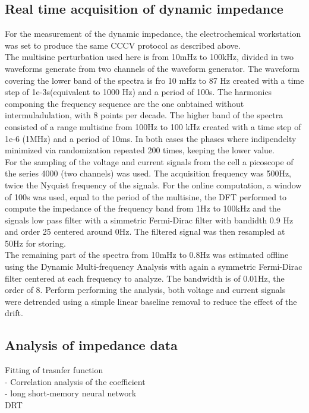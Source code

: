 \subsection{Real time acquisition of dynamic impedance}
For the measurement of the dynamic impedance, the electrochemical workstation was set to produce the same CCCV protocol as described above.\\
The multisine perturbation used here is from 10mHz to 100kHz, divided in two waveforms generate from two channels of the waveform generator. The waveform covering the lower band of the spectra is fro 10 mHz to 87 Hz created with a time step of  1e-3s(equivalent to 1000 Hz) and a period of 100s. The harmonics componing the frequency sequence are the one onbtained without intermuladulation, with 8 points per decade. The higher band of the spectra consisted of a range 
multisine from 100Hz to 100 kHz created with a time step of 1e-6 (1MHz) and a period of 10ms. In both cases the phases where indipendelty minimized via randomization repeated 200 times, keeping the lower value. \\
For the sampling of the voltage and current signals from the cell a picoscope of the series 4000 (two channels) was used. The acquisition frequency was 500Hz, twice the Nyquist frequency of the signals. For the online computation, a window of 100s was used, equal to the period of the multisine, the DFT performed to compute the impedance of the frequency band from 1Hz to 100kHz and the signals low pass filter with a simmetric Fermi-Dirac filter with bandidth 0.9 Hz and order 25 centered around 0Hz. The filtered signal was then resampled at 50Hz for storing. \\
The remaining part of the spectra from 10mHz to 0.8Hz was estimated offline using the Dynamic Multi-frequency Analysis with again a symmetric Fermi-Dirac filter centered at each frequency to analyze. The bandwidth is of 0.01Hz, the order of 8. Perform performing the analysis, both voltage and current signals were detrended using a simple linear baseline removal to reduce the effect of the drift.
\subsection{Analysis of impedance data}
Fitting of trasnfer function\\
- Correlation analysis of the coefficient\\
- long short-memory neural network \\
DRT\\
